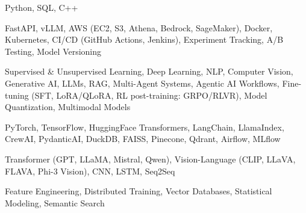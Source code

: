 \documentclass[letter,10pt]{article}
\begin{document}
 Python, SQL, C++\par\vspace{2pt}

 FastAPI, vLLM, AWS (EC2, S3, Athena, Bedrock, SageMaker), Docker, Kubernetes, CI/CD (GitHub Actions, Jenkins), Experiment Tracking, A/B Testing, Model Versioning\par\vspace{2pt}

 Supervised \& Unsupervised Learning, Deep Learning, NLP, Computer Vision, Generative AI, LLMs, RAG, Multi-Agent Systems, Agentic AI Workflows, Fine-tuning (SFT, LoRA/QLoRA, RL post-training: GRPO/RLVR), Model Quantization, Multimodal Models\par\vspace{2pt}

 PyTorch, TensorFlow, HuggingFace Transformers, LangChain, LlamaIndex, CrewAI, PydanticAI, DuckDB, FAISS, Pinecone, Qdrant, Airflow, MLflow\par\vspace{2pt}

 Transformer (GPT, LLaMA, Mistral, Qwen), Vision-Language (CLIP, LLaVA, FLAVA, Phi-3 Vision), CNN, LSTM, Seq2Seq\par\vspace{2pt}

 Feature Engineering, Distributed Training, Vector Databases, Statistical Modeling, Semantic Search
\end{document}
